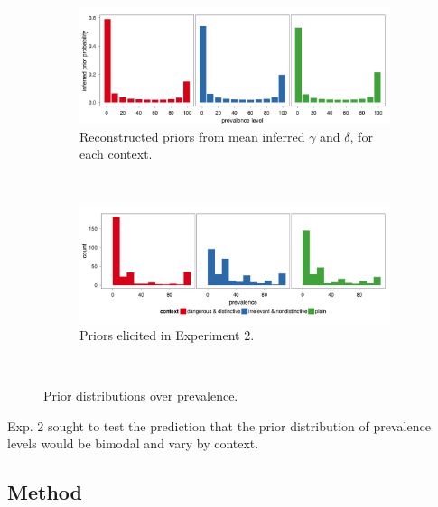 \documentclass[10pt,letterpaper]{article}
\begin{document}
\begin{figure}
        \centering
        \begin{subfigure}[b]{\columnwidth}
    			\includegraphics[width=\columnwidth]{inferred_mean_priors}
                \caption{Reconstructed priors from mean inferred $\gamma$ and $\delta$, for each context.}
                \label{fig:inferredpriors}
        \end{subfigure}%
        
        ~ %
        
        \begin{subfigure}[b]{\columnwidth}
                \includegraphics[width=\columnwidth]{elicited_priors}
                \caption{Priors elicited in Experiment 2.}
                \label{fig:elicitedpriors}
        \end{subfigure}
        ~ %
        \caption{Prior distributions over prevalence.}\label{fig:priors}
\end{figure}


Exp. 2 sought to test the prediction that the prior distribution of prevalence levels would be bimodal and vary by context.

\subsection{Method}
\end{document}
